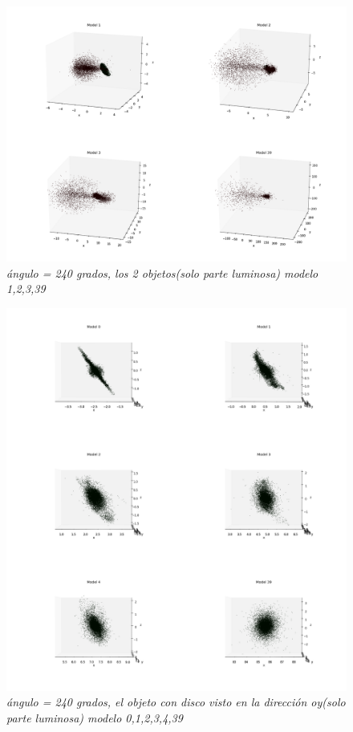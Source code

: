\documentclass[12pt]{article} %
\renewcommand{\=}[1]{\stackrel{#1}{=}} %
\theoremstyle{definition}
\theoremstyle{remark}
\begin{document}
\begin{figure}[!ht]
 \centering
 \includegraphics[scale=0.2]{240deg-m.png}
 \caption{\emph{ ángulo = 240 grados, los 2 objetos(solo parte luminosa) modelo 1,2,3,39 }}
\end{figure}

\begin{figure}[!ht]
 \centering
 \includegraphics[scale=0.2]{240deg-m-c2y.png}
 \caption{\emph{ ángulo = 240 grados, el objeto con disco visto en la dirección oy(solo parte luminosa) modelo 0,1,2,3,4,39 }}
\end{figure}
\end{document}
